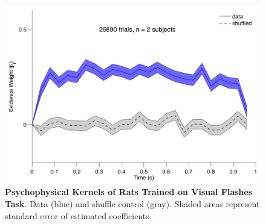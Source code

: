 \begin{figure}
  \centering
  	\includegraphics[width=\textwidth,height=\textheight,keepaspectratio]{Figures/chapter2/rat_kernel.png}
  \caption[Psychophysical Kernels of Rats Trained on Visual Flashes Task]{\textbf{Psychophysical Kernels of Rats Trained on Visual Flashes Task}. Data (blue) and shuffle control (gray). Shaded areas represent standard error of estimated coefficients.}
   \label{fig:ratkernel}
\end{figure}
